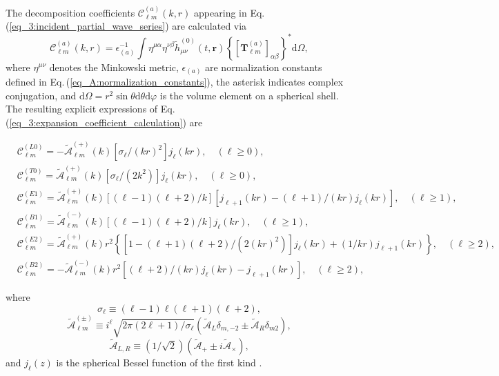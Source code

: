 \documentclass[reprint,amsmath,amssymb,aps,prd]{revtex4-2}
\newcommand{\dd}[0]{\mathrm{d}}
\begin{document}
The decomposition coefficients $\mathscr{C}^{(a)}_{\ell m}(k,r)$ appearing in Eq.\,(\ref{eq_3:incident_partial_wave_series}) are calculated via
\begin{equation}
\label{eq_3:expansion_coefficient_calculation}
\mathscr{C}^{(a)}_{\ell m}(k,r)
=\epsilon_{(a)}^{-1}
\int\eta^{\mu\alpha}\eta^{\nu\beta}
\tilde{h}_{\mu\nu}^{(0)}(t,\bm{r})
\left\{\left[\mathbf{T}^{(a)}_{\ell m}\right]_{\alpha\beta}\right\}^*\dd\Omega,
\end{equation}
where $\eta^{\mu\nu}$ denotes the Minkowski metric, $\epsilon_{(a)}$ are normalization constants defined in Eq.\,(\ref{eq_A:normalization_constants}), the asterisk indicates complex conjugation, and $\dd\Omega=r^2\sin\theta\dd{\theta}\dd{\varphi}$ is the volume element on a spherical shell. The resulting explicit expressions of Eq.\,(\ref{eq_3:expansion_coefficient_calculation}) are
\begin{widetext}
\begin{subequations}
\label{eq_3:radial_planar_GW_TT}
\begin{align}
&\mathscr{C}^{(L0)}_{\ell m}
=-\tilde{\mathcal{A}}_{\ell m}^{(+)}(k)[\sigma_{\ell}/(kr)^2]j_{\ell}(kr),
\quad(\ell\geqslant0),\\
&\mathscr{C}^{(T0)}_{\ell m}
=\tilde{\mathcal{A}}_{\ell m}^{(+)}(k)[\sigma_{\ell}/(2k^2)]j_{\ell}(kr),
\quad(\ell\geqslant0),\\
&\mathscr{C}^{(E1)}_{\ell m}
=\tilde{\mathcal{A}}_{\ell m}^{(+)}(k)[(\ell-1)(\ell+2)/k]\left[j_{\ell+1}(kr)
-(\ell+1)/(kr)j_{\ell}(kr)\right]
,\quad(\ell\geqslant1),\\
&\mathscr{C}^{(B1)}_{\ell m}
=\tilde{\mathcal{A}}_{\ell m}^{(-)}(k)
[(\ell-1)(\ell+2)/k]j_{\ell}(kr)
,\quad(\ell\geqslant1),\\
&\mathscr{C}^{(E2)}_{\ell m}
=\tilde{\mathcal{A}}_{\ell m}^{(+)}(k)r^2\left\{[1
-(\ell+1)(\ell+2)/(2(kr)^2)]j_{\ell}(kr)
+(1/kr)j_{\ell+1}(kr)\right\},
\quad(\ell\geqslant2),\\
&\mathscr{C}^{(B2)}_{\ell m}
=-\tilde{\mathcal{A}}_{\ell m}^{(-)}(k)r^2[(\ell+2)/(kr)j_{\ell}(kr)-j_{\ell+1}(kr)]
,\quad(\ell\geqslant2),
\end{align}
\end{subequations}
\end{widetext}
where 
\begin{equation}
\sigma_{\ell}\equiv(\ell-1)\ell(\ell+1)(\ell+2),
\end{equation}
\begin{equation}
\tilde{\mathcal{A}}_{\ell m}^{(\pm)}\equiv i^{\ell}\sqrt{2\pi(2\ell+1)/\sigma_{\ell}}(\tilde{\mathcal{A}}_{L}\delta_{m,-2}
\pm\tilde{\mathcal{A}}_{R}\delta_{m2}),
\end{equation}
\begin{equation}
\tilde{\mathcal{A}}_{L,R}\equiv(1/\sqrt{2})(\tilde{\mathcal{A}}_{+}\pm i\tilde{\mathcal{A}}_{\times}),
\end{equation}
and $j_{\ell}(z)$ is the spherical Bessel function of the first kind \cite{NIST:DLMF}.
\end{document}
